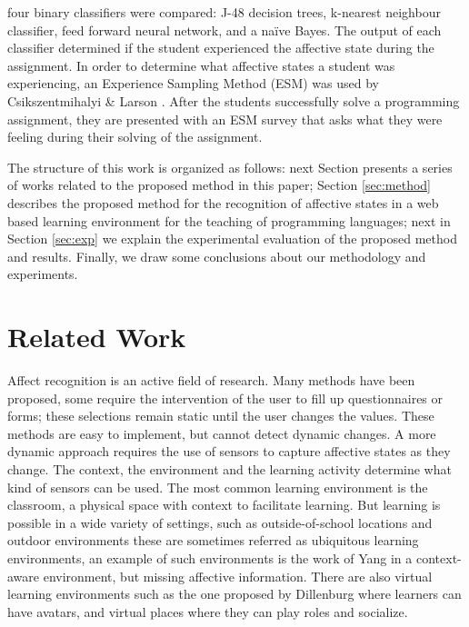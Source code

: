 \documentclass[a4paper,twoside]{article}
\begin{document}
four binary classifiers were compared: J-48 decision trees, k-nearest neighbour
classifier, feed forward neural network, and a na\"ive Bayes. The output of each
classifier determined if the student experienced the affective state during the
assignment.
%
%
In order to determine what
affective states a student was experiencing, an Experience Sampling Method (ESM)
was used by Csikszentmihalyi \& Larson \cite{kubey1996experience}. After the students successfully
solve a programming assignment, they are presented with an ESM survey that asks
what they were feeling during their solving of the assignment.


The structure of this work is organized as follows: next Section 
presents a series of works related to the proposed method in this paper; Section
\ref{sec:method} describes the proposed method for the recognition of affective
states in a web based learning environment for the teaching of programming
languages; next in Section \ref{sec:exp} we explain the experimental evaluation of the
proposed method and results.
Finally, we draw some conclusions about our methodology and
experiments. 


\section{Related Work}

Affect recognition is an active field of research. Many
methods have been proposed, some require the intervention of the user to fill up
questionnaires or forms; these selections remain static until the user changes
the values. These methods are easy to implement, but cannot detect dynamic
changes.  A more dynamic approach requires the use of sensors to capture
affective states as they change. The context, the environment and the learning
activity determine what kind of sensors can be used. The most common learning
environment is the classroom, a physical space with context to facilitate
learning. But learning is possible in a wide variety of settings, such as
outside-of-school locations and outdoor environments these are sometimes
referred as ubiquitous learning environments, an example of such environments is
the work of Yang \cite{yang2006context} in a context-aware environment, but missing affective
information. There are also virtual learning environments such as the one proposed by Dillenburg
\cite{dillenbourg2002virtual}  where learners can have avatars, and virtual places
where they can play roles and socialize.
\end{document}

